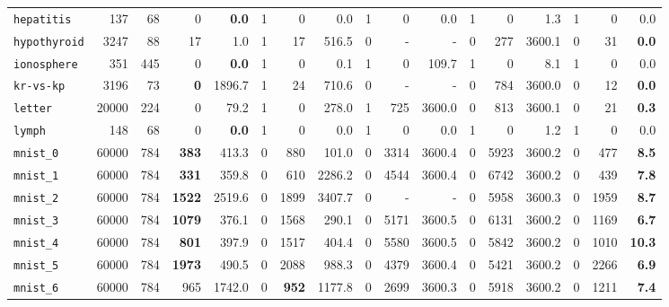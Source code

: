 \begin{tabular}{lccrrrrrrrrrrrrrr}
\texttt{hepatitis} & \multicolumn{1}{r}{137} & \multicolumn{1}{r}{68}  & 0 & \textbf{0.0} & 1 & 0 & 0.0 & 1 & 0 & 0.0 & 1 & 0 & 1.3 & 1 & 0 & 0.0\\
\texttt{hypothyroid} & \multicolumn{1}{r}{3247} & \multicolumn{1}{r}{88}  & 17 & 1.0 & 1 & 17 & 516.5 & 0 & - & - & 0 & 277 & 3600.1 & 0 & 31 & \textbf{0.0}\\
\texttt{ionosphere} & \multicolumn{1}{r}{351} & \multicolumn{1}{r}{445}  & 0 & \textbf{0.0} & 1 & 0 & 0.1 & 1 & 0 & 109.7 & 1 & 0 & 8.1 & 1 & 0 & 0.0\\
\texttt{kr-vs-kp} & \multicolumn{1}{r}{3196} & \multicolumn{1}{r}{73}  & \textbf{0} & 1896.7 & 1 & 24 & 710.6 & 0 & - & - & 0 & 784 & 3600.0 & 0 & 12 & \textbf{0.0}\\
\texttt{letter} & \multicolumn{1}{r}{20000} & \multicolumn{1}{r}{224}  & 0 & 79.2 & 1 & 0 & 278.0 & 1 & 725 & 3600.0 & 0 & 813 & 3600.1 & 0 & 21 & \textbf{0.3}\\
\texttt{lymph} & \multicolumn{1}{r}{148} & \multicolumn{1}{r}{68}  & 0 & \textbf{0.0} & 1 & 0 & 0.0 & 1 & 0 & 0.0 & 1 & 0 & 1.2 & 1 & 0 & 0.0\\
\texttt{mnist\_0} & \multicolumn{1}{r}{60000} & \multicolumn{1}{r}{784}  & \textbf{383} & 413.3 & 0 & 880 & 101.0 & 0 & 3314 & 3600.4 & 0 & 5923 & 3600.2 & 0 & 477 & \textbf{8.5}\\
\texttt{mnist\_1} & \multicolumn{1}{r}{60000} & \multicolumn{1}{r}{784}  & \textbf{331} & 359.8 & 0 & 610 & 2286.2 & 0 & 4544 & 3600.4 & 0 & 6742 & 3600.2 & 0 & 439 & \textbf{7.8}\\
\texttt{mnist\_2} & \multicolumn{1}{r}{60000} & \multicolumn{1}{r}{784}  & \textbf{1522} & 2519.6 & 0 & 1899 & 3407.7 & 0 & - & - & 0 & 5958 & 3600.3 & 0 & 1959 & \textbf{8.7}\\
\texttt{mnist\_3} & \multicolumn{1}{r}{60000} & \multicolumn{1}{r}{784}  & \textbf{1079} & 376.1 & 0 & 1568 & 290.1 & 0 & 5171 & 3600.5 & 0 & 6131 & 3600.2 & 0 & 1169 & \textbf{6.7}\\
\texttt{mnist\_4} & \multicolumn{1}{r}{60000} & \multicolumn{1}{r}{784}  & \textbf{801} & 397.9 & 0 & 1517 & 404.4 & 0 & 5580 & 3600.5 & 0 & 5842 & 3600.2 & 0 & 1010 & \textbf{10.3}\\
\texttt{mnist\_5} & \multicolumn{1}{r}{60000} & \multicolumn{1}{r}{784}  & \textbf{1973} & 490.5 & 0 & 2088 & 988.3 & 0 & 4379 & 3600.4 & 0 & 5421 & 3600.2 & 0 & 2266 & \textbf{6.9}\\
\texttt{mnist\_6} & \multicolumn{1}{r}{60000} & \multicolumn{1}{r}{784}  & 965 & 1742.0 & 0 & \textbf{952} & 1177.8 & 0 & 2699 & 3600.3 & 0 & 5918 & 3600.2 & 0 & 1211 & \textbf{7.4}\\

\end{tabular}
